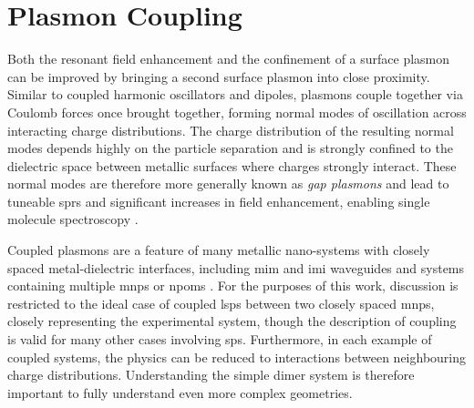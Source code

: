 \documentclass{article}
\begin{document}
\section{Plasmon Coupling}

Both the resonant field enhancement and the confinement of a surface plasmon can be improved by bringing a second surface plasmon into close proximity. Similar to coupled harmonic oscillators and dipoles, plasmons couple together via Coulomb forces once brought together, forming normal modes of oscillation across interacting charge distributions. The charge distribution of the resulting normal modes depends highly on the particle separation and is strongly confined to the dielectric space between metallic surfaces where charges strongly interact. These normal modes are therefore more generally known as \emph{gap plasmons} and lead to tuneable \glspl{spr} \cite{huang2010, millyard2012} and significant increases in field enhancement, enabling single molecule spectroscopy \cite{mertens2013, taylor2014}.

Coupled plasmons are a feature of many metallic nano-systems with closely spaced metal-dielectric interfaces, including \gls{mim} and \gls{imi} waveguides \cite{maier2007plasmonics, lindquist2013} and systems containing multiple \glspl{mnp} \cite{maier2002, atay2004, muskens2007, huang2010, millyard2012, taylor2011, herrmann2013} or \glspl{npom} \cite{okamoto2003, daniels2005, kinnan2007, mubeen2012, mertens2013, denijs2014}. For the purposes of this work, discussion is restricted to the ideal case of coupled \glspl{lsp} between two closely spaced \glspl{mnp}, closely representing the experimental system, though the description of coupling is valid for many other cases involving \glspl{sp}. Furthermore, in each example of coupled systems, the physics can be reduced to interactions between neighbouring charge distributions. Understanding the simple dimer system is therefore important to fully understand even more complex geometries.
\end{document}
